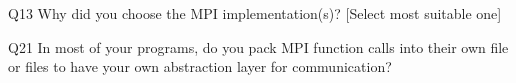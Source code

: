 \begin{description}%
\item{Q13} Why did you choose the MPI implementation(s)? [Select most suitable one]%
\item{Q21} In most of your programs, do you pack MPI function calls into their own file or files to have your own abstraction layer for communication?%
\end{description}%
